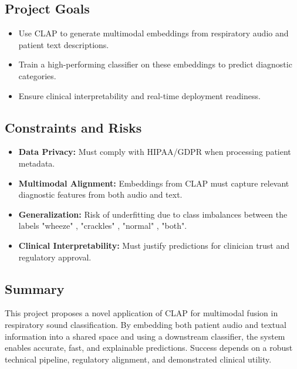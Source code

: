 \subsection{Project Goals}
\begin{itemize}
    \item Use CLAP to generate multimodal embeddings from respiratory audio and patient text descriptions.
    \item Train a high-performing classifier on these embeddings to predict diagnostic categories.
    \item Ensure clinical interpretability and real-time deployment readiness.
\end{itemize}

\subsection{Constraints and Risks}
\begin{itemize}
    \item \textbf{Data Privacy:} Must comply with HIPAA/GDPR when processing patient metadata.
    \item \textbf{Multimodal Alignment:} Embeddings from CLAP must capture relevant diagnostic features from both audio and text.
    \item \textbf{Generalization:} Risk of underfitting due to class imbalances between the labels "wheeze" , "crackles" , "normal" , "both".
    \item \textbf{Clinical Interpretability:} Must justify predictions for clinician trust and regulatory approval.
\end{itemize}

\subsection*{Summary}
This project proposes a novel application of CLAP for multimodal fusion in respiratory sound classification. By embedding both patient audio and textual information into a shared space and using a downstream classifier, the system enables accurate, fast, and explainable predictions. Success depends on a robust technical pipeline, regulatory alignment, and demonstrated clinical utility.

